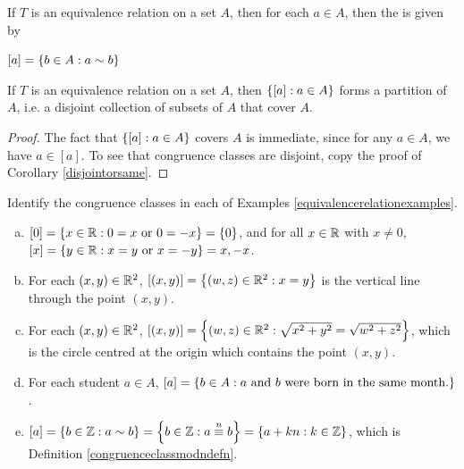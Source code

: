 \documentclass[11pt,fleqn,dvipsnames,usenames]{article}
\begin{document}
%
\begin{definition}
If $T$ is an equivalence relation on a set $A$, then for each $a\in A$, then the  is given by
\begin{center}
$[a] = \left\{b\in A: a\sim b\right\}$
\end{center}
\end{definition}
%
\begin{theorem}
If $T$ is an equivalence relation on a set $A$, then $\left\{[a]:a\in A\right\}$ forms a partition of $A$, i.e. a disjoint collection of subsets of $A$ that cover $A$.
\end{theorem}
%
\begin{proof}
The fact that $\left\{[a]:a\in A\right\}$ covers $A$ is immediate, since for any $a\in A$, we have $a\in [a]$.  To see that congruence classes are disjoint, copy the proof of
Corollary \ref{disjointorsame}.
\end{proof}
%
\begin{examples}
Identify the congruence classes in each of Examples \ref{equivalencerelationexamples}.
\end{examples}
%
\begin{solution}
\begin{enumerate}[(a)]
\item $[0] = \left\{x\in\mathbb{R}: 0 = x\text{ or }0 = -x\right\} = \left\{0\right\}$, and for all $x\in \mathbb{R}$ with $x\neq 0$, $[x] = \left\{y\in\mathbb{R}: x = y\text{ or }x = -y\right\}= {x,-x}$.
\item For each $(x,y)\in\mathbb{R}^{2}$, $[(x,y)] = \left\{(w,z)\in\mathbb{R}^{2}:x = y\right\}$ is the vertical line through the point $(x,y)$.
\item For each $(x,y)\in\mathbb{R}^{2}$, $[(x,y)] = \left\{(w,z)\in\mathbb{R}^{2}: \sqrt{x^2 + y^2} = \sqrt{w^2 + z^2}\right\}$, which is the circle centred at the origin which contains the point $(x,y)$.
\item For each student $a\in A$, $[a] = \left\{b\in A:a\text{ and }b\text{ were born in the same month.}\right\}$.
\item $[a] = \left\{b\in\mathbb{Z}:a\sim b\right\} = \left\{b\in\mathbb{Z}: a\overset{n}{\equiv}b\right\} = \left\{a+kn:k\in\mathbb{Z}\right\}$, which is Definition \ref{congruenceclassmodndefn}.
\end{enumerate}
\end{solution}
%
\end{document}
